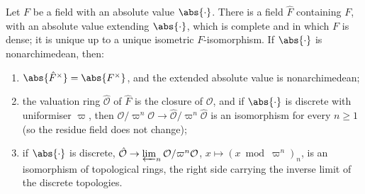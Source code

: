 \begin{theorem}[completion]\label{thm:local:completion}
Let $F$ be a field with an absolute value $\abs{\cdot}$. There is a field $\hat F$ containing $F$, with an absolute value extending
$\abs{\cdot}$, which is complete and in which $F$ is dense; it is unique up to a unique isometric $F$-isomorphism. If $\abs{\cdot}$ is
nonarchimedean, then:
\begin{enumerate}[label=(\roman*)]
\item $\abs{\hat F^\times}=\abs{F^\times}$, and the extended absolute value is nonarchimedean;
\item the valuation ring $\hat{\mathcal O}$ of $\hat F$ is the closure of $\mathcal O$, and if $\abs{\cdot}$ is discrete with uniformiser $\varpi$,
then $\mathcal O/\varpi^n\mathcal O\to\hat{\mathcal O}/\varpi^n\hat{\mathcal O}$ is an isomorphism for every $n\ge1$ (so the residue field does not change);
\item if $\abs{\cdot}$ is discrete, $\hat{\mathcal O}\to\varprojlim_n\mathcal O/\varpi^n\mathcal O$, $x\mapsto(x\bmod\varpi^n)_n$, is an isomorphism of
topological rings, the right side carrying the inverse limit of the discrete topologies.
\end{enumerate}
\end{theorem}

